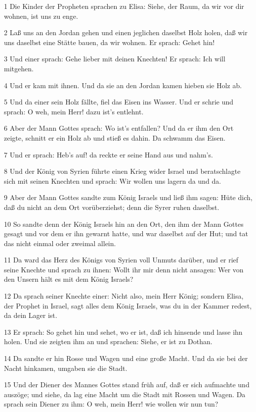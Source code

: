 \par 1 Die Kinder der Propheten sprachen zu Elisa: Siehe, der Raum, da wir vor dir wohnen, ist uns zu enge.
\par 2 Laß uns an den Jordan gehen und einen jeglichen daselbst Holz holen, daß wir uns daselbst eine Stätte bauen, da wir wohnen. Er sprach: Gehet hin!
\par 3 Und einer sprach: Gehe lieber mit deinen Knechten! Er sprach: Ich will mitgehen.
\par 4 Und er kam mit ihnen. Und da sie an den Jordan kamen hieben sie Holz ab.
\par 5 Und da einer sein Holz fällte, fiel das Eisen ins Wasser. Und er schrie und sprach: O weh, mein Herr! dazu ist's entlehnt.
\par 6 Aber der Mann Gottes sprach: Wo ist's entfallen? Und da er ihm den Ort zeigte, schnitt er ein Holz ab und stieß es dahin. Da schwamm das Eisen.
\par 7 Und er sprach: Heb's auf! da reckte er seine Hand aus und nahm's.
\par 8 Und der König von Syrien führte einen Krieg wider Israel und beratschlagte sich mit seinen Knechten und sprach: Wir wollen uns lagern da und da.
\par 9 Aber der Mann Gottes sandte zum König Israels und ließ ihm sagen: Hüte dich, daß du nicht an dem Ort vorüberziehst; denn die Syrer ruhen daselbst.
\par 10 So sandte denn der König Israels hin an den Ort, den ihm der Mann Gottes gesagt und vor dem er ihn gewarnt hatte, und war daselbst auf der Hut; und tat das nicht einmal oder zweimal allein.
\par 11 Da ward das Herz des Königs von Syrien voll Unmuts darüber, und er rief seine Knechte und sprach zu ihnen: Wollt ihr mir denn nicht ansagen: Wer von den Unsern hält es mit dem König Israels?
\par 12 Da sprach seiner Knechte einer: Nicht also, mein Herr König; sondern Elisa, der Prophet in Israel, sagt alles dem König Israels, was du in der Kammer redest, da dein Lager ist.
\par 13 Er sprach: So gehet hin und sehet, wo er ist, daß ich hinsende und lasse ihn holen. Und sie zeigten ihm an und sprachen: Siehe, er ist zu Dothan.
\par 14 Da sandte er hin Rosse und Wagen und eine große Macht. Und da sie bei der Nacht hinkamen, umgaben sie die Stadt.
\par 15 Und der Diener des Mannes Gottes stand früh auf, daß er sich aufmachte und auszöge; und siehe, da lag eine Macht um die Stadt mit Rossen und Wagen. Da sprach sein Diener zu ihm: O weh, mein Herr! wie wollen wir nun tun?
